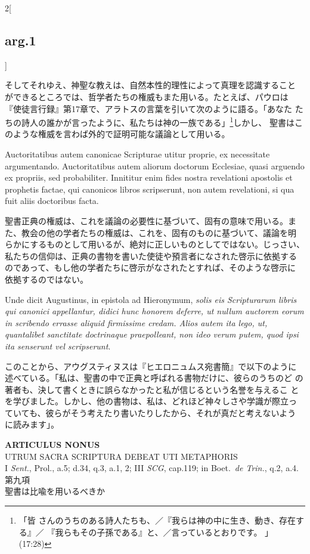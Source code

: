 \documentclass[
paper=a4paper,
fontsize=10pt,
jafontsize=9pt,
titlepage
]{jlreq}
\begin{document}
\begin{paracol}{2}[\subsection{arg.1}]
\switchcolumn

そしてそれゆえ、神聖な教えは、自然本性的理性によって真理を認識すること
ができるところでは、哲学者たちの権威もまた用いる。たとえば、パウロは
『使徒言行録』第17章で、アラトスの言葉を引いて次のように語る。「あなた
たちの詩人の誰かが言ったように、私たちは神の一族である」\footnote{「皆
さんのうちのある詩人たちも、／『我らは神の中に生き、動き、存在する』／
『我らもその子孫である』と、／言っているとおりです。 」(17:28)}しかし、
聖書はこのような権威を言わば外的で証明可能な議論として用いる。

\switchcolumn*

Auctoritatibus autem canonicae Scripturae utitur proprie, ex
necessitate argumentando. Auctoritatibus autem aliorum doctorum
Ecclesiae, quasi arguendo ex propriis, sed probabiliter. Innititur
enim fides nostra revelationi apostolis et prophetis factae, qui
canonicos libros scripserunt, non autem revelationi, si qua fuit aliis
doctoribus facta.

\switchcolumn

聖書正典の権威は、これを議論の必要性に基づいて、固有の意味で用いる。ま
た、教会の他の学者たちの権威は、これを、固有のものに基づいて、議論を明
らかにするものとして用いるが、絶対に正しいものとしてではない。じっさい、
私たちの信仰は、正典の書物を書いた使徒や預言者になされた啓示に依拠する
のであって、もし他の学者たちに啓示がなされたとすれば、そのような啓示に
依拠するのではない。

\switchcolumn*

Unde dicit Augustinus, in epistola ad Hieronymum, {\itshape solis eis
Scripturarum libris qui canonici appellantur, didici hunc honorem
deferre, ut nullum auctorem eorum in scribendo errasse aliquid
firmissime credam. Alios autem ita lego, ut, quantalibet sanctitate
doctrinaque praepolleant, non ideo verum putem, quod ipsi ita
senserunt vel scripserunt}.

\switchcolumn

このことから、アウグスティヌスは『ヒエロニュムス宛書簡』で以下のように
述べている。「私は、聖書の中で正典と呼ばれる書物だけに、彼らのうちのど
の著者も、決して書くときに誤らなかったと私が信じるという名誉を与えるこ
とを学びました。しかし、他の書物は、私は、どれほど神々しさや学識が際立っ
ていても、彼らがそう考えたり書いたりしたから、それが真だと考えないよう
に読みます」。

\end{paracol}
\newpage


{}
\setcounter{section}{9}
\setcounter{subsection}{0}
\begin{center}
 {\Large {\bfseries ARTICULUS NONUS}}\\
 {\large UTRUM SACRA SCRIPTURA DEBEAT UTI METAPHORIS}\\
 {\footnotesize I {\itshape Sent.}, Prol., a.5; d.34, q.3, a.1, 2; III
 {\itshape SCG}, cap.119; in Boet.~{\itshape de Trin.}, q.2, a.4.}\\
 {\Large 第九項\\聖書は比喩を用いるべきか}
\end{center}
\end{document}
